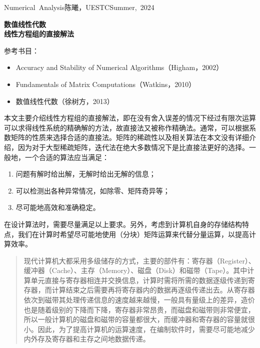 \documentclass[a4paper,10pt]{ctexart}
\begin{document}
\hfill\vbox{\hbox{Numerical Analysis}\hbox{陈曦，UESTC}\hbox{Summer, 2024}}

\begin{center}\Large
    \textbf{数值线性代数}\\{\normalsize\bf {线性方程组的直接解法}}
\end{center}
\vskip 30pt
\small {参考书目：
\begin{itemize}
    \item Accuracy and Stability of Numerical Algorithms（Higham，2002）
    \item Fundamentals of Matrix Computations（Watkins，2010）
    \item 数值线性代数（徐树方，2013）
\end{itemize}}

本文主要介绍线性方程组的直接解法，即在没有舍入误差的情况下经过有限次运算可以求得线性系统的精确解的方法，故直接法又被称作精确法。通常，可以根据系数矩阵的性质来选择合适的直接法。矩阵的稀疏性以及相关算法在本文没有详细介绍，因为对于大型稀疏矩阵，迭代法在绝大多数情况下是比直接法更好的选择。一般地，一个合适的算法应当满足：
\begin{enumerate}
    \item 问题有解时给出解，无解时给出无解的信息；
    \item 可以检测出各种异常情况，如除零、矩阵奇异等；
    \item 尽可能地高效和准确稳定。
\end{enumerate}
在设计算法时，需要尽量满足以上要求。另外，考虑到计算机自身的存储结构特点，我们在计算时希望尽可能地使用（分块）矩阵运算来代替分量运算，以提高计算效率。

\begin{quotation}
    现代计算机大都采用多级储存的方式，主要的部件有：寄存器（Register）、缓冲器（Cache）、主存（Memory）、磁盘（Disk）和磁带（Tape）。其中计算单元直接与寄存器相连并交换信息，计算时需将所需的数据逐级传递到寄存器，而计算结束之后需要再将寄存器内的数据再逐级传递出去。从寄存器依次到磁带其处理传递信息的速度越来越慢，一般具有量级上的差异，造价也是随着级别的下降而下降，寄存器非常昂贵，而磁盘和磁带则非常便宜，所以一般计算机的磁盘和磁带的容量都很大，而缓冲器和寄存器的容量就很小。因此，为了提高计算机的运算速度，在编制软件时，需要尽可能地减少内外存及寄存器和主存之间地数据传递。
\end{quotation}
\end{document}
